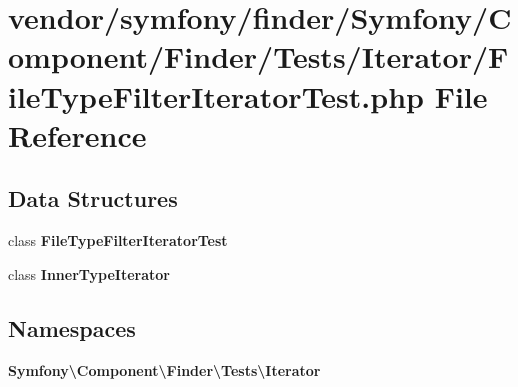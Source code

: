 \section{vendor/symfony/finder/\+Symfony/\+Component/\+Finder/\+Tests/\+Iterator/\+File\+Type\+Filter\+Iterator\+Test.php File Reference}
\label{_file_type_filter_iterator_test_8php}
\subsection*{Data Structures}
\begin{DoxyCompactItemize}
\item 
class {\bf File\+Type\+Filter\+Iterator\+Test}
\item 
class {\bf Inner\+Type\+Iterator}
\end{DoxyCompactItemize}
\subsection*{Namespaces}
\begin{DoxyCompactItemize}
\item 
 {\bf Symfony\textbackslash{}\+Component\textbackslash{}\+Finder\textbackslash{}\+Tests\textbackslash{}\+Iterator}
\end{DoxyCompactItemize}

